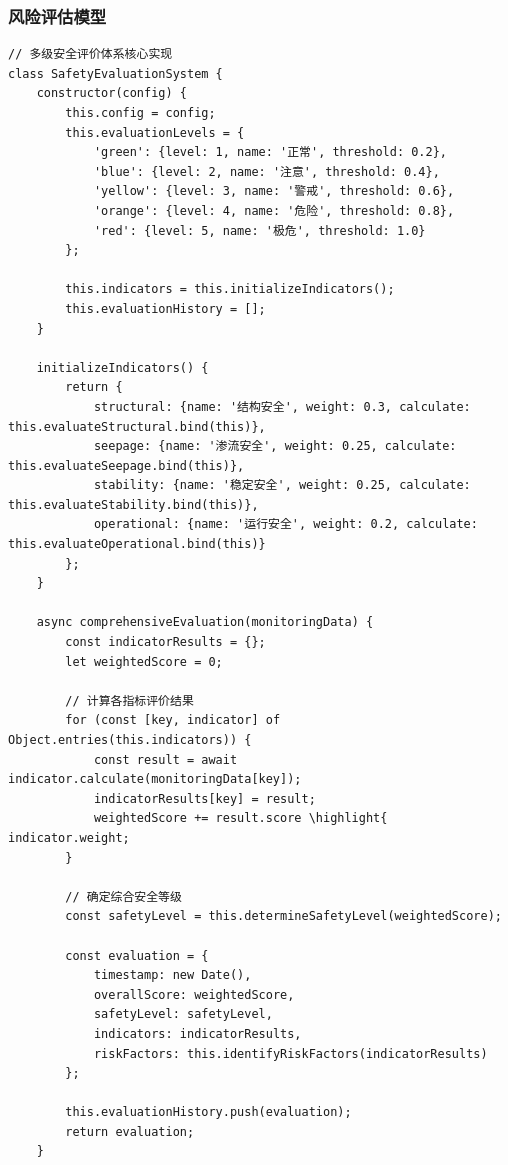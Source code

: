 \hypertarget{ux98ceux9669ux8bc4ux4f30ux6a21ux578b}{%
\subsubsection{风险评估模型}\label{ux98ceux9669ux8bc4ux4f30ux6a21ux578b}}

\begin{lstlisting}[style=javascript]
// 多级安全评价体系核心实现
class SafetyEvaluationSystem {
    constructor(config) {
        this.config = config;
        this.evaluationLevels = {
            'green': {level: 1, name: '正常', threshold: 0.2},
            'blue': {level: 2, name: '注意', threshold: 0.4}, 
            'yellow': {level: 3, name: '警戒', threshold: 0.6},
            'orange': {level: 4, name: '危险', threshold: 0.8},
            'red': {level: 5, name: '极危', threshold: 1.0}
        };
        
        this.indicators = this.initializeIndicators();
        this.evaluationHistory = [];
    }
    
    initializeIndicators() {
        return {
            structural: {name: '结构安全', weight: 0.3, calculate: this.evaluateStructural.bind(this)},
            seepage: {name: '渗流安全', weight: 0.25, calculate: this.evaluateSeepage.bind(this)}, 
            stability: {name: '稳定安全', weight: 0.25, calculate: this.evaluateStability.bind(this)},
            operational: {name: '运行安全', weight: 0.2, calculate: this.evaluateOperational.bind(this)}
        };
    }
    
    async comprehensiveEvaluation(monitoringData) {
        const indicatorResults = {};
        let weightedScore = 0;
        
        // 计算各指标评价结果
        for (const [key, indicator] of Object.entries(this.indicators)) {
            const result = await indicator.calculate(monitoringData[key]);
            indicatorResults[key] = result;
            weightedScore += result.score \highlight{ indicator.weight;
        }
        
        // 确定综合安全等级
        const safetyLevel = this.determineSafetyLevel(weightedScore);
        
        const evaluation = {
            timestamp: new Date(),
            overallScore: weightedScore,
            safetyLevel: safetyLevel,
            indicators: indicatorResults,
            riskFactors: this.identifyRiskFactors(indicatorResults)
        };
        
        this.evaluationHistory.push(evaluation);
        return evaluation;
    }
    

\end{lstlisting}
